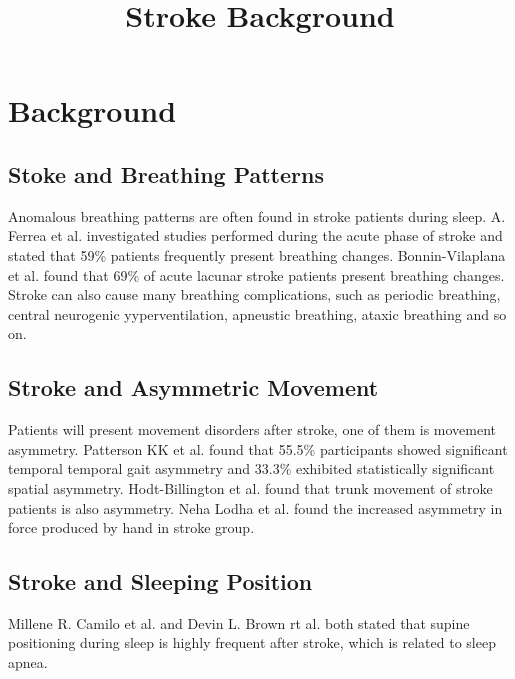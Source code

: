 \documentclass{article}
\begin{document}
	\title{Stroke Background}
	\date{}
	\maketitle
	\section{Background}
	\subsection{Stoke and Breathing Patterns}
	Anomalous breathing patterns are often found in stroke patients during sleep. A. Ferrea et al.\cite{ferre2013strokes} investigated studies performed during the acute phase of stroke and stated that 59\% patients frequently present breathing changes. Bonnin-Vilaplana et al.\cite{bonnin2009sleep} found that 69\% of acute lacunar stroke patients present breathing changes. Stroke can also cause many breathing complications, such as periodic breathing, central neurogenic yyperventilation, apneustic breathing, ataxic breathing and so on\cite{rochester2002respiratory}.
	
	
	
	
	
	
	\subsection{Stroke and Asymmetric Movement}
	Patients will present movement disorders after stroke, one of them is movement asymmetry. Patterson KK et al.\cite{patterson2008gait} found that 55.5\% participants showed significant temporal temporal gait asymmetry and 33.3\% exhibited statistically significant spatial asymmetry. Hodt-Billington et al.\cite{hodt2008should} found that trunk movement of stroke patients is also asymmetry. Neha Lodha et al.\cite{lodha2012bimanual} found the increased asymmetry in force produced by hand in stroke group.
	
	
	\subsection{Stroke and Sleeping Position}
	
	Millene R. Camilo et al.\cite{camilo2012supine} and Devin L. Brown rt al.\cite{brown2008high} both stated that supine positioning during sleep is highly frequent after stroke, which is related to sleep apnea.
	
	
	{}
	
\end{document}
